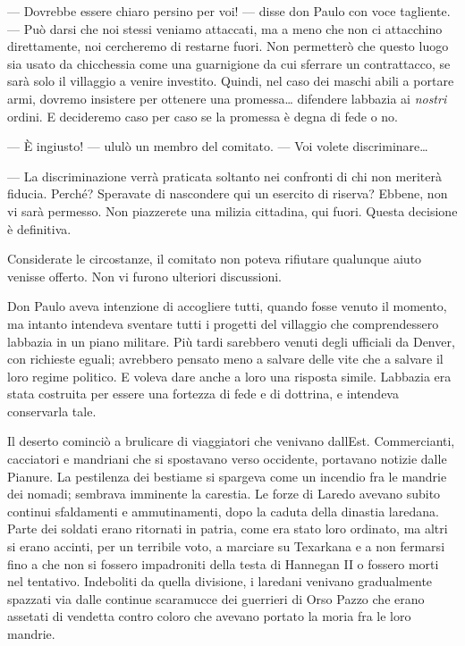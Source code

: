 --- Dovrebbe essere chiaro persino per voi! --- disse don Paulo con voce
tagliente. --- Può darsi che noi stessi veniamo attaccati, ma a meno che
non ci attacchino direttamente, noi cercheremo di restarne fuori. Non
permetterò che questo luogo sia usato da chicchessia come una
guarnigione da cui sferrare un contrattacco, se sarà solo il villaggio a
venire investito. Quindi, nel caso dei maschi abili a portare armi,
dovremo insistere per ottenere una promessa\ldots{} difendere
l\textquotesingle abbazia ai \emph{nostri} ordini. E decideremo caso per
caso se la promessa è degna di fede o no.

--- È ingiusto! --- ululò un membro del comitato. --- Voi volete
discriminare\ldots{}

--- La discriminazione verrà praticata soltanto nei confronti di chi non
meriterà fiducia. Perché? Speravate di nascondere qui un esercito di
riserva? Ebbene, non vi sarà permesso. Non piazzerete una milizia
cittadina, qui fuori. Questa decisione è definitiva.

Considerate le circostanze, il comitato non poteva rifiutare qualunque
aiuto venisse offerto. Non vi furono ulteriori discussioni.

Don Paulo aveva intenzione di accogliere tutti, quando fosse venuto il
momento, ma intanto intendeva sventare tutti i progetti del villaggio
che comprendessero l\textquotesingle abbazia in un piano militare. Più
tardi sarebbero venuti degli ufficiali da Denver, con richieste eguali;
avrebbero pensato meno a salvare delle vite che a salvare il loro regime
politico. E voleva dare anche a loro una risposta simile.
L\textquotesingle abbazia era stata costruita per essere una fortezza di
fede e di dottrina, e intendeva conservarla tale.

Il deserto cominciò a brulicare di viaggiatori che venivano
dall\textquotesingle Est. Commercianti, cacciatori e mandriani che si
spostavano verso occidente, portavano notizie dalle Pianure. La
pestilenza dei bestiame si spargeva come un incendio fra le mandrie dei
nomadi; sembrava imminente la carestia. Le forze di Laredo avevano
subito continui sfaldamenti e ammutinamenti, dopo la caduta della
dinastia laredana. Parte dei soldati erano ritornati in patria, come era
stato loro ordinato, ma altri si erano accinti, per un terribile voto, a
marciare su Texarkana e a non fermarsi fino a che non si fossero
impadroniti della testa di Hannegan II o fossero morti nel tentativo.
Indeboliti da quella divisione, i laredani venivano gradualmente
spazzati via dalle continue scaramucce dei guerrieri di Orso Pazzo che
erano assetati di vendetta contro coloro che avevano portato la moria
fra le loro mandrie.

